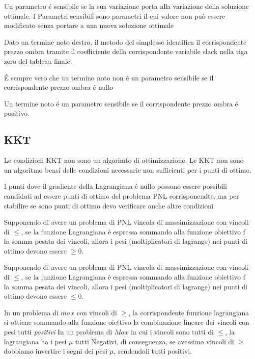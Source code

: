 \documentclass[12pt, a4paper, openany]{book}
\begin{document}
\affermazionetrue
{Un parametro é sensibile se la sua variazione porta alla variazione della soluzione ottimale.}
{I Parametri sensibili sono parametri il cui valore non può essere modificato senza portare a una nuova soluzione ottimale}

\affermazionetrue
{Dato un termine noto destro, il metodo del simplesso identifica il corrispondente prezzo ombra tramite il coefficiente
della corrispondente variabile slack nella riga zero del tableau finale.}
{}

\affermazione
{É sempre vero che un termino noto non é un parametro sensibile se il corrispondente prezzo ombra é nullo}

\affermazione
{Un termine noto é un parametro sensibile se il corrispondente prezzo ombra é positivo.}


\subsection{KKT}
\affermazionetrue
{Le condizioni KKT non sono un algorimto di ottimizzazione.}
{Le KKT non sono un algoritmo bensí delle condizioni necessarie non sufficienti per i punti di ottimo.}

\affermazionetrue
{I punti dove il gradiente della Lagrangiana é nullo possono essere possibili candidati ad essere punti di ottimo del problema PNL corrisponendte,
ma per stabilire se sono punti di ottimo devo verificare anche altre condizioni}
{}

\affermazionetrue
{Supponendo di avere un problema di PNL vincola di massimizzazione con vincoli di $\leq$, se la funzione Lagrangiana é espressa sommando alla funzione obiettivo f la somma pesata dei vincoli, allora i pesi (moltiplicatori di lagrange) nei punti di ottimo devono essere $\geq 0$.}

\affermazionefalse
{Supponendo di avere un problema di PNL vincola di massimizzazione con vincoli di $\leq$, se la funzione Lagrangiana é espressa sommando alla funzione obiettivo f la somma pesata dei vincoli, allora i pesi (moltiplicatori di lagrange) nei punti di ottimo devono essere $\leq 0$.}

\affermazionetrue
{In un problema di $max$ con vincoli di $\geq$, la corrispondente funzione lagrangiana si ottiene sommando alla funzione oiettivo la combinazione lineare dei vincoli con pesi tutti \emph{positivi}}
{In un problema di $Max$ in cui i vincoli sono tutti di $\leq$, la lagrangiana ha i pesi $\mu$ tutti Negativi, di conseguenza, se avessimo vincoli di $\geq$ dobbiamo invertire i segni dei pesi $\mu$, rendendoli tutti positivi.}
\end{document}
